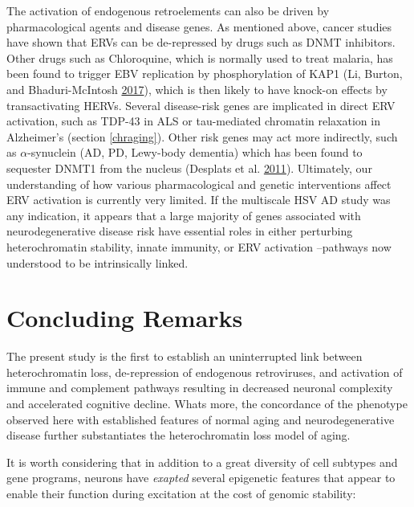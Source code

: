 \documentclass[onehalf,12pt]{beavtex}
\begin{document}
  The activation of endogenous retroelements can also be driven by
  pharmacological agents and disease genes. As mentioned above, cancer
  studies have shown that ERVs can be de-repressed by drugs such as DNMT
  inhibitors. Other drugs such as Chloroquine, which is normally used to
  treat malaria, has been found to trigger EBV replication by
  phosphorylation of KAP1 (Li, Burton, and Bhaduri-McIntosh
  \protect\hyperlink{ref-LiChloroquinetriggersEpsteinBarr2017a}{2017}),
  which is then likely to have knock-on effects by transactivating HERVs.
  Several disease-risk genes are implicated in direct ERV activation, such
  as TDP-43 in ALS or tau-mediated chromatin relaxation in Alzheimer's
  (section \ref{chraging}). Other risk genes may act more indirectly, such
  as \(\alpha\)-synuclein (AD, PD, Lewy-body dementia) which has been
  found to sequester DNMT1 from the nucleus (Desplats et al.
  \protect\hyperlink{ref-DesplatsaSynucleinSequestersDnmt12011}{2011}).
  Ultimately, our understanding of how various pharmacological and genetic
  interventions affect ERV activation is currently very limited. If the
  multiscale HSV AD study was any indication, it appears that a large
  majority of genes associated with neurodegenerative disease risk have
  essential roles in either perturbing heterochromatin stability, innate
  immunity, or ERV activation --pathways now understood to be
  intrinsically linked.
  
  \section{Concluding Remarks}\label{concluding-remarks}
  
  The present study is the first to establish an uninterrupted link
  between heterochromatin loss, de-repression of endogenous retroviruses,
  and activation of immune and complement pathways resulting in decreased
  neuronal complexity and accelerated cognitive decline. Whats more, the
  concordance of the phenotype observed here with established features of
  normal aging and neurodegenerative disease further substantiates the
  heterochromatin loss model of aging.
  
  It is worth considering that in addition to a great diversity of cell
  subtypes and gene programs, neurons have \emph{exapted} several
  epigenetic features that appear to enable their function during
  excitation at the cost of genomic stability:
  
\end{document}

